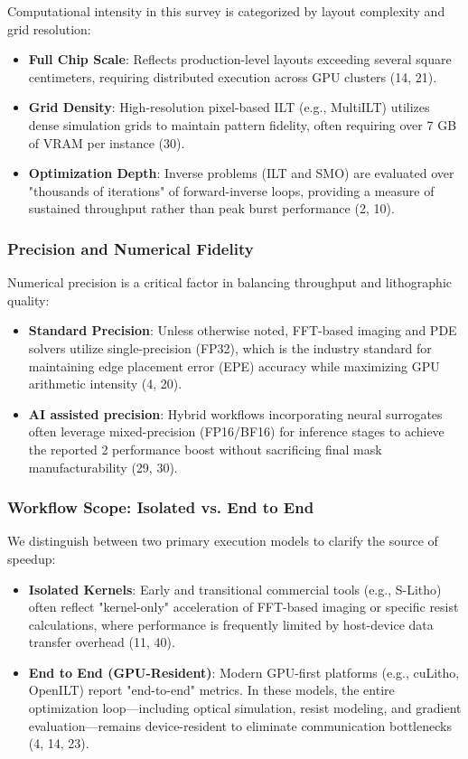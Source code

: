 \documentclass[pdflatex,sn-mathphys-num]{sn-jnl}%
\theoremstyle{thmstyleone}%
\theoremstyle{thmstyletwo}%
\theoremstyle{thmstylethree}%
\begin{document}
 Computational intensity in this survey is categorized by layout complexity and grid resolution:
 \begin{itemize}
  \item \textbf{Full Chip Scale}: Reflects production-level layouts exceeding several square centimeters, requiring distributed execution across GPU clusters (14, 21).
  \item \textbf{Grid Density}: High-resolution pixel-based ILT (e.g., MultiILT) utilizes dense simulation grids to maintain pattern fidelity, often requiring over 7 GB of VRAM per instance (30).
  \item \textbf{Optimization Depth}: Inverse problems (ILT and SMO) are evaluated over "thousands of iterations" of forward-inverse loops, providing a measure of sustained throughput rather than peak burst performance (2, 10).
 \end{itemize}

 \subsubsection{Precision and Numerical Fidelity}

 Numerical precision is a critical factor in balancing throughput and lithographic quality:
 \begin{itemize}
  \item \textbf{Standard Precision}: Unless otherwise noted, FFT-based imaging and PDE solvers utilize single-precision (FP32), which is the industry standard for maintaining edge placement error (EPE) accuracy while maximizing GPU arithmetic intensity (4, 20).
  \item \textbf{AI assisted precision}: Hybrid workflows incorporating neural surrogates often leverage mixed-precision (FP16/BF16) for inference stages to achieve the reported 2
  performance boost without sacrificing final mask manufacturability (29, 30).
 \end{itemize}

 \subsubsection{Workflow Scope: Isolated vs. End to End}

 We distinguish between two primary execution models to clarify the source of speedup:
 \begin{itemize}
  \item \textbf{Isolated Kernels}: Early and transitional commercial tools (e.g., S-Litho) often reflect "kernel-only" acceleration of FFT-based imaging or specific resist calculations, where performance is frequently limited by host-device data transfer overhead (11, 40).
  \item \textbf{End to End (GPU-Resident)}: Modern GPU-first platforms (e.g., cuLitho, OpenILT) report "end-to-end" metrics. In these models, the entire optimization loop—including optical simulation, resist modeling, and gradient evaluation—remains device-resident to eliminate communication bottlenecks (4, 14, 23).
 \end{itemize}
\end{document}
